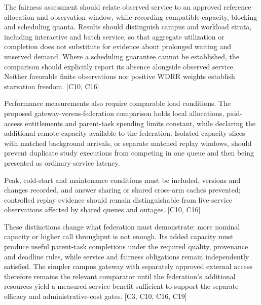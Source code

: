 \documentclass[11pt]{article}
\begin{document}
The fairness assessment should relate observed service to an approved reference allocation and observation window, while recording compatible capacity, blocking and scheduling quanta. Results should distinguish campus and workload strata, including interactive and batch service, so that aggregate utilization or completion does not substitute for evidence about prolonged waiting and unserved demand. Where a scheduling guarantee cannot be established, the comparison should explicitly report its absence alongside observed service. Neither favorable finite observations nor positive WDRR weights establish starvation freedom. [C10, C16]

Performance measurements also require comparable load conditions. The proposed gateway-versus-federation comparison holds local allocations, paid-access entitlements and parent-task spending limits constant, while declaring the additional remote capacity available to the federation. Isolated capacity slices with matched background arrivals, or separate matched replay windows, should prevent duplicate study executions from competing in one queue and then being presented as ordinary-service latency.

Peak, cold-start and maintenance conditions must be included, versions and changes recorded, and answer sharing or shared cross-arm caches prevented; controlled replay evidence should remain distinguishable from live-service observations affected by shared queues and outages. [C10, C16]

These distinctions change what federation must demonstrate: more nominal capacity or higher call throughput is not enough. Its added capacity must produce useful parent-task completions under the required quality, provenance and deadline rules, while service and fairness obligations remain independently satisfied. The simpler campus gateway with separately approved external access therefore remains the relevant comparator until the federation\textquoteright{}s additional resources yield a measured service benefit sufficient to support the separate efficacy and administrative-cost gates. [C3, C10, C16, C19]
\end{document}
